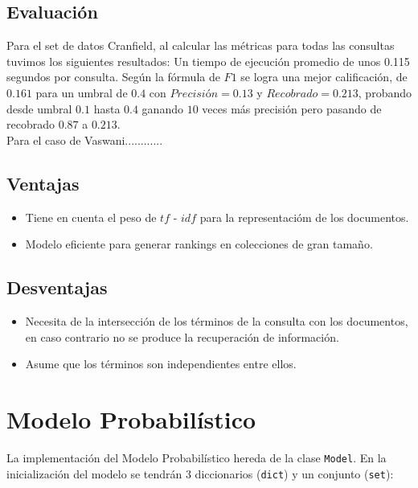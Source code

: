 \documentclass[spanish]{article}
\begin{document}
			\subsection*{Evaluación}

				Para el set de datos Cranfield, al calcular las métricas para todas las consultas tuvimos los siguientes resultados: 
				Un tiempo de ejecución promedio de unos 0.115 segundos por consulta. 
				Según la fórmula de $F1$ se logra una mejor calificación, de $0.161$ para un umbral de $0.4$ con $Precisión= 0.13$ y $Recobrado= 0.213$, probando desde umbral $0.1$ hasta $0.4$ 
				ganando $10$ veces más precisión pero pasando de recobrado $0.87$ a $0.213$.\\

				Para el caso de Vaswani............


			\subsection*{Ventajas}
				
				\begin{itemize}
					\item Tiene en cuenta el peso de $tf$ - $idf$ para la representacióm de los documentos.
					\item Modelo eficiente para generar rankings en colecciones de gran tamaño.
				\end{itemize}	


			\subsection*{Desventajas}

			\begin{itemize}
				\item Necesita de la intersección de los términos de la consulta con los documentos, en caso contrario no se produce la recuperación de información.
				\item Asume que los términos son independientes entre ellos.
			\end{itemize}




		\section*{Modelo Probabilístico}

			La implementación del Modelo Probabilístico hereda de la clase \texttt{Model}. En la inicialización del modelo se tendrán 3 diccionarios (\texttt{dict}) y un conjunto (\texttt{set}): \\
\end{document}

